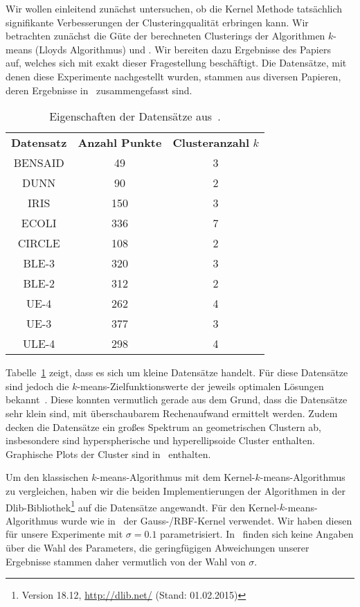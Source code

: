 Wir wollen einleitend zunächst untersuchen, ob die Kernel Methode tatsächlich signifikante Verbesserungen der
Clusteringqualität erbringen kann. Wir betrachten zunächst die Güte der berechneten Clusterings der Algorithmen
$k$-means (Lloyds Algorithmus) und \kkmpp{}. Wir bereiten dazu Ergebnisse des Papiers~\cite{KimLLL05} auf, welches sich mit
exakt dieser Fragestellung beschäftigt. Die Datensätze, mit denen diese Experimente nachgestellt wurden, stammen aus diversen
Papieren, deren Ergebnisse in~\cite{Bezdek99} zusammengefasst sind.
\begin{table}[t]
\centering
\begin{tabular}{@{}ccc@{}} \toprule
	\textbf{Datensatz} & \textbf{Anzahl Punkte} & \textbf{Clusteranzahl} $k$ \\
	BENSAID & 49 & 3 \\
	DUNN & 90 & 2 \\
	IRIS & 150 & 3 \\
	ECOLI & 336 & 7 \\
	CIRCLE & 108 & 2 \\
	BLE-3 & 320 & 3 \\
	BLE-2 & 312 & 2 \\
	UE-4 & 262 & 4 \\
	UE-3 & 377 & 3 \\
	ULE-4 & 298 & 4 \\ \bottomrule
\end{tabular}
\caption{Eigenschaften der Datensätze aus~\cite{Bezdek99}.}
\label{tbl:experiment-kernel-method-quality-datasets}
\end{table}
Tabelle~\ref{tbl:experiment-kernel-method-quality-datasets} zeigt, dass es sich um kleine Datensätze handelt. Für diese
Datensätze sind jedoch die $k$-means-Zielfunktionswerte der jeweils optimalen Lösungen bekannt~\cite{Bezdek99}. Diese konnten
vermutlich gerade aus dem Grund, dass die Datensätze sehr klein sind, mit überschaubarem Rechenaufwand ermittelt werden.
Zudem decken die Datensätze ein großes Spektrum an geometrischen Clustern ab, insbesondere sind hyperspherische und
hyperellipsoide Cluster enthalten. Graphische Plots der Cluster sind in~\cite{KimLLL05} enthalten.

Um den klassischen $k$-means-Algorithmus mit dem Kernel-$k$-means-Algorithmus zu vergleichen, haben wir die beiden
Implementierungen der Algorithmen in der Dlib-Bibliothek\footnote{Version 18.12, \url{http://dlib.net/} (Stand: 01.02.2015)}
auf die Datensätze angewandt. Für den Kernel-$k$-means-Algorithmus wurde wie in~\cite{KimLLL05} der Gauss-/RBF-Kernel
verwendet. Wir haben diesen für unsere Experimente mit $\sigma = 0.1$ parametrisiert. In~\cite{KimLLL05} finden sich keine
Angaben über die Wahl des Parameters, die geringfügigen Abweichungen unserer Ergebnisse stammen daher vermutlich von der Wahl
von $\sigma$.

